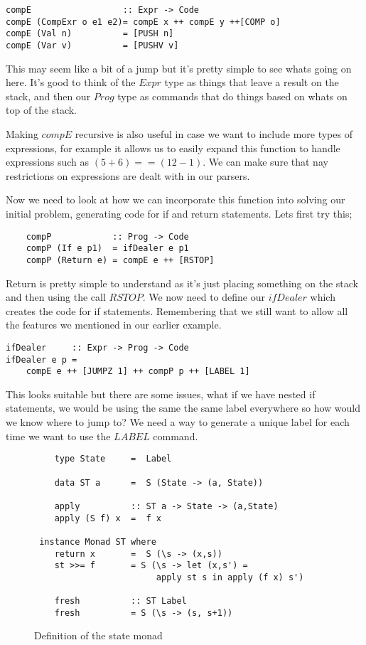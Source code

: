 \begin{lstlisting}
compE                  :: Expr -> Code
compE (CompExr o e1 e2)= compE x ++ compE y ++[COMP o]
compE (Val n)          = [PUSH n]
compE (Var v)          = [PUSHV v]
\end{lstlisting}  

This may seem like a bit of a jump but it's pretty simple to see whats going on here. It's good to think of the $Expr$ type as things that leave a result on the stack, and then our $Prog$ type as commands that do things based on whats on top of the stack.

Making $compE$ recursive is also useful in case we want to include more types of expressions, for example it allows us to easily expand this function to handle expressions such as $(5 + 6) == (12 - 1)$. We can make sure that nay restrictions on expressions are dealt with in our parsers. 

Now we need to look at how we can incorporate this function into solving our initial problem, generating code for if and return statements. Lets first try this; 

\begin{lstlisting}
	compP            :: Prog -> Code 
	compP (If e p1)  = ifDealer e p1  
	compP (Return e) = compE e ++ [RSTOP] 
\end{lstlisting}

Return is pretty simple to understand as it's just placing something on the stack and then using the call $RSTOP$. We now need to define our $ifDealer$ which creates the code for if statements. Remembering that we still want to allow all the features we mentioned in our earlier example.

\begin{lstlisting}
ifDealer     :: Expr -> Prog -> Code 
ifDealer e p = 
	compE e ++ [JUMPZ 1] ++ compP p ++ [LABEL 1]
\end{lstlisting}

This looks suitable but there are some issues, what if we have nested if statements, we would be using the same the same label everywhere so how would we know where to jump to? We need a way to generate a unique label for each time we want to use the $LABEL$ command.

\begin{figure}[h]
\centering
\begin{lstlisting}
    type State 	   =  Label

    data ST a 	   =  S (State -> (a, State))

    apply          :: ST a -> State -> (a,State)
    apply (S f) x  =  f x

 instance Monad ST where
    return x       =  S (\s -> (x,s))
    st >>= f   	   = S (\s -> let (x,s') = 
                        apply st s in apply (f x) s')

    fresh          :: ST Label
    fresh          = S (\s -> (s, s+1))

\end{lstlisting}
\caption{Definition of the state monad}
\label{fig:stMonad}
\end{figure}  

